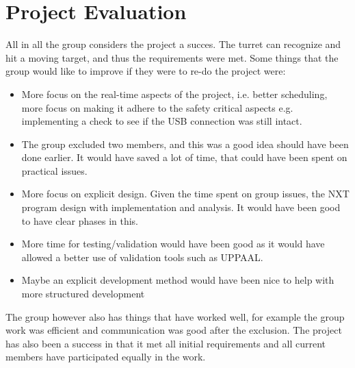 \section{Project Evaluation}
All in all the group considers the project a succes. The turret can recognize and hit a moving target, and thus the requirements were met. Some things that the group would like to improve if they were to re-do the project were:
\begin{itemize}
	\item More focus on the real-time aspects of the project, i.e. better scheduling, more focus on making it adhere to the safety critical aspects e.g. implementing a check to see if the USB connection was still intact.
	\item The group excluded two members, and this was a good idea should have been done earlier. It would have saved a lot of time, that could have been spent on practical issues.
	\item More focus on explicit design. Given the time spent on group issues, the NXT program design with implementation and analysis. It would have been good to have clear phases in this.
	\item More time for testing/validation would have been good as it would have allowed a better use of validation tools such as UPPAAL.
	\item Maybe an explicit development method would have been nice to help with more structured development
\end{itemize}

The group however also has things that have worked well, for example the group work was efficient and communication was good after the exclusion. The project has also been a success in that it met all initial requirements and all current members have participated equally in the work.
